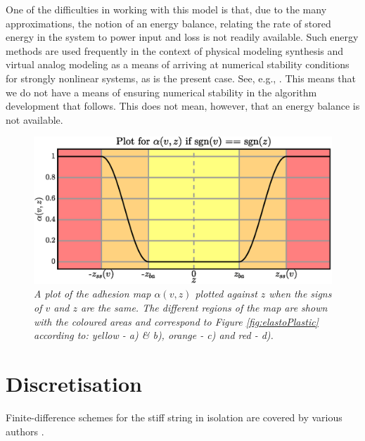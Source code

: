     One of the difficulties in working with this model is that, due to the many approximations, the notion of an energy balance, relating the rate of stored energy in the system to power input and loss is not readily available. Such energy methods are used frequently in the context of physical modeling synthesis and virtual analog modeling as a means of arriving at numerical stability conditions for strongly nonlinear systems, as is the present case. See, e.g., \cite{Bilbao2009}. This means that we do not have a means of ensuring numerical stability in the algorithm development that follows. This does not mean, however, that an energy balance is not available. 
    
    \begin{figure}[ht]
    \centerline{\includegraphics[width=\paperFigWidth\textwidth]{figures/drawAlpha3.eps}}
    \caption{\label{fig:alphaPlot}{\it A plot of the adhesion map $\alpha(v,z)$ plotted against $z$ when the signs of $v$ and $z$ are the same. The different regions of the map are shown with the coloured areas and correspond to Figure \ref{fig:elastoPlastic} according to: yellow - a) \& b), orange - c) and red - d).}}
    \end{figure}
    
    \section{Discretisation}\label{sec:discretisation}
    Finite-difference schemes for the stiff string in isolation are covered by various authors \cite{Chaigne, Bilbao2009}. 
    

